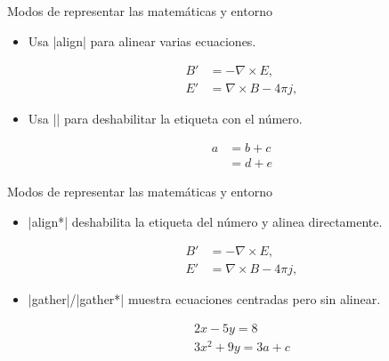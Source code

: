 \begin{frame}[fragile]{Modos de representar las matemáticas y entorno}
  \begin{itemize}
    \item Usa \latexinline|align| para alinear varias ecuaciones.
          \begin{latexexample}
            \begin{align}
              B' &=-\nabla \times E, \\
              E' &=\nabla \times B - 4\pi j,
            \end{align}
          \end{latexexample}
    \item Usa \latexinline|\nonumber| para deshabilitar la etiqueta con el número.
          \begin{latexexample}
            \begin{align}
              a &= b + c \nonumber \\
                &= d + e
            \end{align}
          \end{latexexample}
  \end{itemize}
\end{frame}

\begin{frame}[fragile]{Modos de representar las matemáticas y entorno}
  \begin{itemize}
    \item \latexinline|align*| deshabilita la etiqueta del número y alinea directamente.
          \begin{latexexample}
            \begin{align*}
              B' &=-\nabla \times E, \\
              E' &=\nabla \times B - 4\pi j,
            \end{align*}
          \end{latexexample}
    \item \latexinline|gather|/\latexinline|gather*| muestra ecuaciones centradas pero sin alinear.
          \begin{latexexample}
            \begin{gather*}
              2x - 5y =  8 \\
              3x^2 + 9y =  3a + c
            \end{gather*}
          \end{latexexample}
  \end{itemize}
\end{frame}

